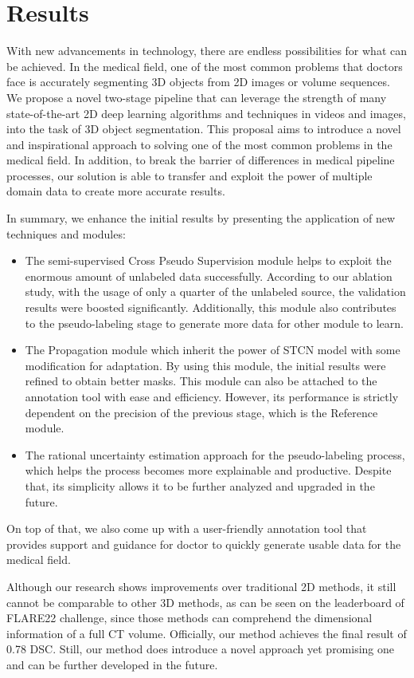 \section{Results}

With new advancements in technology, there are endless possibilities for what can be achieved. In the medical field, one of the most common problems that doctors face is accurately segmenting 3D objects from 2D images or volume sequences. We propose a novel two-stage pipeline that can leverage the strength of many state-of-the-art 2D deep learning algorithms and techniques in videos and images, into the task of 3D object segmentation. This proposal aims to introduce a novel and inspirational approach to solving one of the most common problems in the medical field. In addition, to break the barrier of differences in medical pipeline processes, our solution is able to transfer and exploit the power of multiple domain data to create more accurate results.

In summary, we enhance the initial results by presenting the application of new techniques and modules:

\begin{itemize}
    \item The semi-supervised Cross Pseudo Supervision module helps to exploit the enormous amount of unlabeled data successfully. According to our ablation study, with the usage of only a quarter of the unlabeled source, the validation results were boosted significantly. Additionally, this module also contributes to the pseudo-labeling stage to generate more data for other module to learn.
    
    \item The Propagation module which inherit the power of STCN model with some modification for adaptation. By using this module, the initial results were refined to obtain better masks. This module can also be attached to the annotation tool with ease and efficiency. However, its performance is strictly dependent on the precision of the previous stage, which is the Reference module. 
    
    \item The rational uncertainty estimation approach for the pseudo-labeling process, which helps the process becomes more explainable and productive. Despite that, its simplicity allows it to be further analyzed and upgraded in the future.  

\end{itemize}

On top of that, we also come up with a user-friendly annotation tool that provides support and guidance for doctor to quickly generate usable data for the medical field. 

Although our research shows improvements over traditional 2D methods, it still cannot be comparable to other 3D methods, as can be seen on the leaderboard of FLARE22 challenge, since those methods can comprehend the dimensional information of a full CT volume. Officially, our method achieves the final result of 0.78 DSC. Still, our method does introduce a novel approach yet promising one and can be further developed in the future.